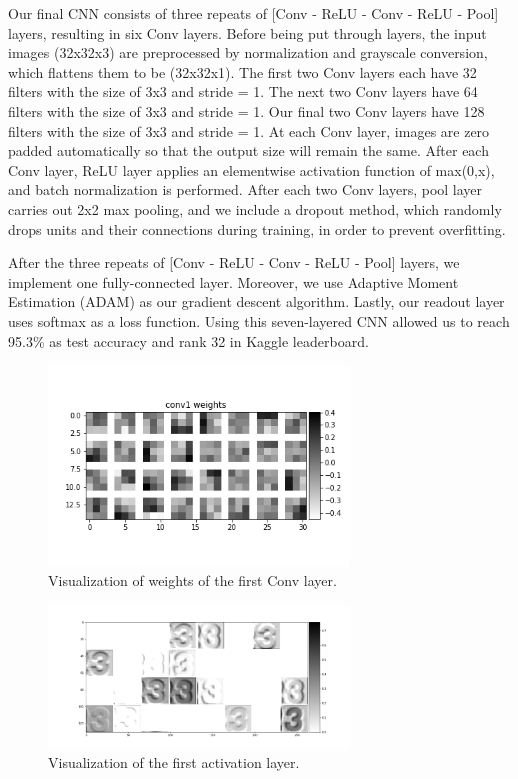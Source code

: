 \documentclass[12pt]{article}
\begin{document}
\indent Our final CNN consists of three repeats of [Conv - ReLU - Conv - ReLU - Pool] layers, resulting in six Conv layers. Before being put through layers, the input images (32x32x3) are preprocessed by normalization and grayscale conversion, which flattens them to be (32x32x1). The first two Conv layers each have 32 filters with the size of 3x3 and stride = 1. The next two Conv layers have 64 filters with the size of 3x3 and stride = 1. Our final two Conv layers have 128 filters with the size of 3x3 and stride = 1. At each Conv layer, images are zero padded automatically so that the output size will remain the same. After each Conv layer, ReLU layer applies an elementwise activation function of max(0,x), and batch normalization is performed. After each two Conv layers, pool layer carries out 2x2 max pooling, and we include a dropout method, which randomly drops units and their connections during training, in order to prevent overfitting.

\indent After the three repeats of [Conv - ReLU - Conv - ReLU - Pool] layers, we implement one fully-connected layer.  Moreover, we use Adaptive Moment Estimation (ADAM) as our gradient descent algorithm. Lastly, our readout layer uses softmax as a loss function. Using this seven-layered CNN allowed us to reach 95.3\% as test accuracy and rank 32 in Kaggle leaderboard. 


\begin{figure}[!tpb]
	\centerline{\includegraphics[width=80mm]{conv1_weights.png}}
	\caption{\label{Figure 8}
		Visualization of weights of the first Conv layer.}
\end{figure}

\begin{figure}[!tpb]
	\centerline{\includegraphics[width=80mm]{Conv1_Activate.png}}
	\caption{\label{Figure 9}
		Visualization of the first activation layer.}
\end{figure}
\end{document}
